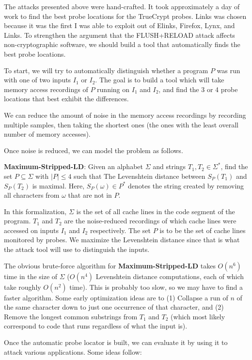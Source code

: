\documentclass{acm_proc_article-sp}
\begin{document}
The attacks presented above were hand-crafted. It took approximately a day of
work to find the best probe locations for the TrueCrypt probes. Links was chosen
because it was the first I was able to exploit out of Elinks, Firefox, Lynx, and
Links. To strengthen the argument that the FLUSH+RELOAD attack affects
non-cryptographic software, we should build a tool that automatically finds the
best probe locations. 

To start, we will try to automatically distinguish whether a program $P$ was run
with one of two inputs $I_1$ or $I_2$. The goal is to build a tool which will
take memory access recordings of $P$ running on $I_1$ and $I_2$, and find the
3 or 4 probe locations that best exhibit the differences.

We can reduce the amount of noise in the memory access recordings by recording
multiple samples, then taking the shortest ones (the ones with the least overall
number of memory accesses).

Once noise is reduced, we can model the problem as follows.

\textbf{Maximum-Stripped-LD}: Given an alphabet $\Sigma$ and strings $T_1, T_2
\in \Sigma^{*}$, find the set $P \subseteq \Sigma$ with $|P| \leq 4$ such that
The Levenshtein distance between $S_P(T_1)$ and $S_P(T_2)$ is maximal. Here,
$S_P(\omega) \in P^{*}$ denotes the string created by removing all characters
from $\omega$ that are not in $P$.

In this formalization, $\Sigma$ is the set of all cache lines in the code
segment of the program. $T_1$ and $T_2$ are the noise-reduced recordings of
which cache lines were accessed on inputs $I_1$ and $I_2$ respectively. The set
$P$ is to be the set of cache lines monitored by probes. We maximize the
Levenshtein distance since that is what the attack tool will use to distinguish
the inputs.

The obvious brute-force algorithm for \textbf{Maximum-Stripped-LD} takes
$O(n^6)$ time in the size of $\Sigma$ ($O(n^4)$ Levenshtein distance
computations, each of which take roughly $O(n^2)$ time). This is probably too
slow, so we may have to find a faster algorithm. Some early optimization ideas
are to (1) Collapse a run of $n$ of the same character down to just one
occurrence of that character, and (2) Remove the longest common substrings from
$T_1$ and $T_2$ (which most likely correspond to code that runs regardless of
what the input is).

Once the automatic probe locator is built, we can evaluate it by using it to
attack various applications. Some ideas follow:
\end{document}
